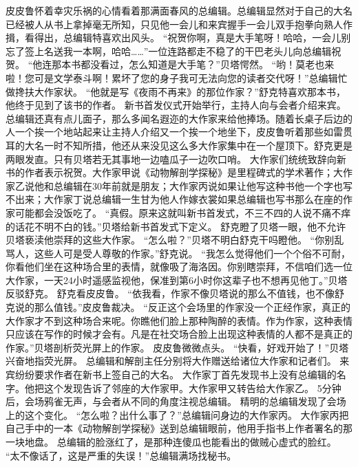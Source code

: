 \documentclass[a4paper,12pt,UTF8,twoside]{ctexbook}
\begin{document}
        皮皮鲁怀着幸灾乐祸的心情看着那满面春风的总编辑。总编辑显然对于自己的大名已经被人从书上拿掉毫无所知，只见他一会儿和来宾握手一会儿双手抱拳向熟人作揖，看得出，总编辑特喜欢出风头。 
        “祝贺你啊，真是大手笔呀！哈哈，一会儿别忘了签上名送我一本啊，哈哈……”一位连路都走不稳了的干巴老头儿向总编辑祝贺。 
        “他连那本书都没看过，怎么知道是大手笔？”贝塔愕然。 
        “哟！莫老也来啦！您可是文学泰斗啊！累坏了您的身子我可无法向您的读者交代呀！”总编辑忙做搀扶大作家状。 
        “他就是写《夜雨不再来》的那位作家？”舒克特喜欢那本书，他终于见到了该书的作者。 
        新书首发仪式开始举行，主持人向与会者介绍来宾。 
        总编辑还真有点儿面子，那么多闻名遐迩的大作家来给他捧场。随着长桌子后边的人一个挨一个地站起来让主持人介绍又一个挨一个地坐下，皮皮鲁听着那些如雷贯耳的大名一时不知所措，他还从来没见这么多大作家集中在一个屋顶下。舒克更是两眼发直。只有贝塔若无其事地一边嗑瓜子一边吹口哨。 
        大作家们统统致辞向新书的作者表示祝贺。大作家甲说《动物解剖学探秘》是里程碑式的学术著作；大作家乙说他和总编辑在30年前就是朋友；大作家丙说如果让他写这种书他一个字也写不出来；大作家丁说总编辑一生甘为他人作嫁衣裳如果总编辑也写书那么在座的作家可能都会没饭吃了。 
        “真假。原来这就叫新书首发式，不三不四的人说不痛不痒的话花不明不白的钱。”贝塔给新书首发式下定义。 
        舒克瞪了贝塔一眼，他不允许贝塔亵渎他崇拜的这些大作家。 
        “怎么啦？”贝塔不明白舒克干吗瞪他。 
        “你别乱骂人，这些人可是受人尊敬的作家。”舒克说。 
        “我怎么觉得他们一个个俗不可耐，你看他们坐在这种场合里的表情，就像吸了海洛因。你别瞎崇拜，不信咱们选一位大作家，一天24小时遥感监视他，保准到第6小时你这辈子也不想再见他丁。”贝塔反驳舒克。 
        舒克看皮皮鲁。 
        “依我看，作家不像贝塔说的那么不值钱，也不像舒克说的那么值钱。”皮皮鲁裁决。 
        “反正这个会场里的作家没一个正经作家，真正的大作家才不到这种场合来呢。你瞧他们脸上那种陶醉的表情。作为作家，这种表情只应该在写作的时候才会有。凡是在社交场合脸上出现这种表情的人都不是真正的作家。”贝塔剖析荧光屏上的作家。 
        皮皮鲁微微点头。 
        “快看，好戏开始了！”贝塔兴奋地指荧光屏。 
        总编辑和解剖主任分别将大作赠送给诸位大作家和记者们。 
        来宾纷纷要求作者在新书上签自己的大名。 
        大作家丁首先发现书上没有总编辑的名字。他把这个发现告诉了邻座的大作家甲。大作家甲又转告给大作家乙。 
        5分钟后，会场鸦雀无声，与会者从不同的角度注视总编辑。 
        精明的总编辑发现了会场上的这个变化。 
        “怎么啦？出什么事了？”总编辑问身边的大作家丙。 
        大作家丙把自己手中的一本《动物解剖学探秘》送到总编辑眼前，他用手指书上作者署名的那一块地盘。 
        总编辑的脸涨红了，是那种连傻瓜也能看出的做贼心虚式的脸红。 
        “太不像话了，这是严重的失误！”总编辑满场找秘书。 
\end{document}
